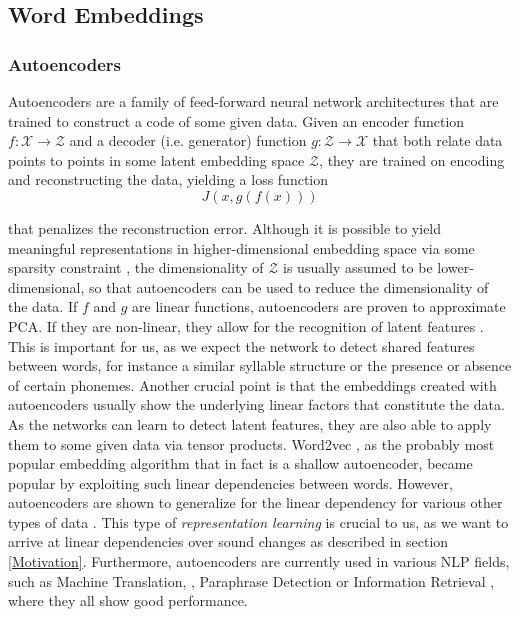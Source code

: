 \documentclass[6pt]{article}
\begin{document}
\subsection{Word Embeddings}
\label{Word Embeddings}
\subsubsection{Autoencoders}

Autoencoders are a family of feed-forward neural network architectures that are trained to construct a code of some given data. Given an encoder function $f: \mathcal{X} \rightarrow \mathcal{Z}$ and a decoder (i.e. generator) function $g: \mathcal{Z} \rightarrow \mathcal{X}$ that both relate data points to points in some latent embedding space $\mathcal{Z}$, they are trained on encoding and reconstructing the data, yielding a loss function
\begin{equation}
J(x,g(f(x)))
\end{equation}
 
that penalizes the reconstruction error. Although it is possible to yield meaningful representations in higher-dimensional embedding space via some sparsity constraint \citep{ng2011sparse}, the dimensionality of $\mathcal{Z}$ is usually assumed to be lower-dimensional, so that autoencoders can be used to reduce the dimensionality of the data. If $f$ and $g$ are linear functions, autoencoders are proven to approximate PCA. If they are non-linear, they allow for the recognition of latent features \citep{hinton2006reducing}. This is important for us, as we expect the network to detect shared features between words, for instance a similar syllable structure or the presence or absence of certain phonemes. Another crucial point is that the embeddings created with autoencoders usually show the underlying linear factors that constitute the data. As the networks can learn to detect latent features, they are also able to apply them to some given data via tensor products. Word2vec \citep{mikolov2013efficient,mikolov2013distributed,goldberg2014word2vec}, as the probably most popular embedding algorithm that in fact is a shallow autoencoder, became popular by exploiting such linear dependencies between words. However, autoencoders are shown to generalize for the linear dependency for various other types of data \citep{radford2015unsupervised,dosovitskiy2015learning}. This type of \textit{representation learning} \citep[p. 526]{Goodfellow-et-al-2016-Book} is crucial to us, as we want to arrive at linear dependencies over sound changes as described in section \ref{Motivation}.  Furthermore, autoencoders are currently used in various NLP fields, such as Machine Translation, \citep{lauly2014autoencoder,zhang2014bilingually}, Paraphrase Detection  \citep{socher2011dynamic} or Information Retrieval \citep{silberer2014learning,le2014distributed}, where they all show good performance. 
\end{document}
